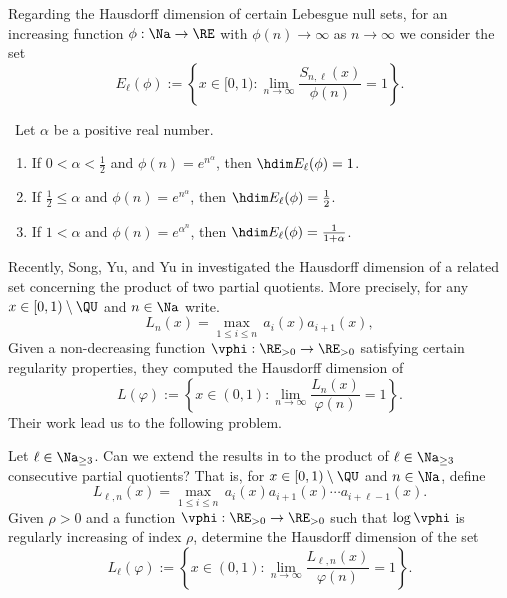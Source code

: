 \documentclass[12pt,a4paper]{amsart}
\begin{document}
Regarding the Hausdorff dimension of certain Lebesgue null sets, for an increasing function $\phi:\Na\to\RE$ with $\phi(n)\to\infty$ as $n\to\infty$ we consider the set 
\[
E_{\ell}(\phi)
:=
\left\{ x\in [0,1): \lim_{n\to\infty} \frac{S_{n,\ell}(x)}{\phi(n)}=1\right\}.
\]
\begin{teo01}\ 
Let $\alpha$ be a positive real number.
\begin{enumerate}[\rm (I)]
    \item If $0<\alpha<\frac{1}{2}$ and $\phi(n)=e^{n^{\alpha}}$, then $\hdim E_{\ell}(\phi)=1$.
    \item If $\frac{1}{2}\leq \alpha$ and $\phi(n)=e^{n^{\alpha}}$, then $\hdim E_{\ell}(\phi)=\frac{1}{2}$.
    \item If $1<\alpha$ and $\phi(n)=e^{\alpha^n}$, then $\hdim E_{\ell}(\phi)=\frac{1}{1+\alpha}$.
\end{enumerate}
\end{teo01}
 Recently, Song, Yu, and Yu in \cite{SYY2025} investigated the Hausdorff dimension of a related set concerning the product of two partial quotients. 
 More precisely, for any $x\in [0,1)\setminus\QU$ and $n\in\Na$ write.
 \[
 L_n(x) = \max_{1\leq i\leq n} \, a_i(x)a_{i+1}(x),
 \]
  Given a non-decreasing function $\vphi:\RE_{>0}\to\RE_{>0}$ satisfying certain regularity properties, they computed the Hausdorff dimension of 
        \[
            L(\varphi):= \left\{ x\in(0,1): \lim_{n\to \infty} \frac{L_n(x)}{\varphi(n)}=1\right\}.
        \] 
        Their work lead us to the following problem.
        \begin{prob01}
        Let $\ell\in\Na_{\geq 3}$.
        Can we extend the results in \cite{SYY2025} to the product of $\ell\in\Na_{\geq 3}$ consecutive partial quotients? 
        That is, for $x\in [0,1)\setminus\QU$ and $n\in\Na$, define
        \[
        L_{\ell,n}(x) = \max_{1\leq i\leq n}\, a_i(x)a_{i+1}(x)\cdots a_{i+ \ell -1 }(x) .
        \]
        Given $\rho>0$ and a function $\vphi:\RE_{>0}\to\RE_{>0}$ such that $\log \vphi$ is regularly increasing of index $\rho$, determine the Hausdorff dimension of the set
        \[
            L_{\ell}(\varphi)
            := 
            \left\{ x\in(0,1): \lim_{n\to \infty} \frac{L_{\ell,n}(x)}{\varphi(n)}=1\right\}.
        \] 
        \end{prob01}
\end{document}
